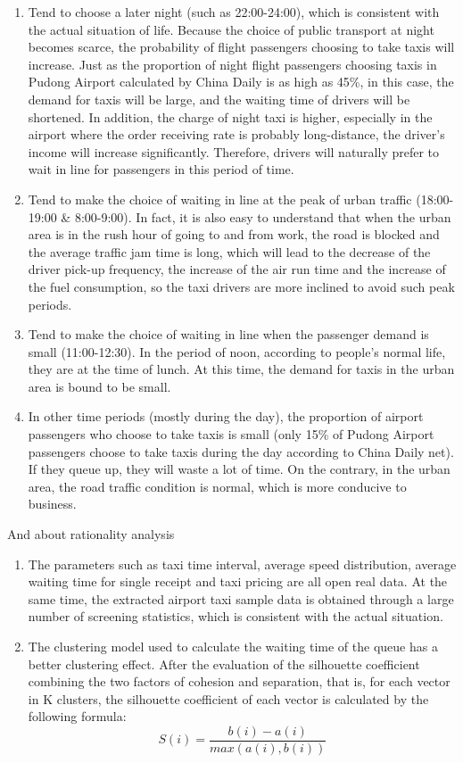 \begin{enumerate}
\item Tend to choose a later night (such as 22:00-24:00), which is consistent with the actual situation of life. Because the choice of public transport at night becomes scarce, the probability of flight passengers choosing to take taxis will increase. Just as the proportion of night flight passengers choosing taxis in Pudong Airport calculated by China Daily is as high as 45\%, in this case, the demand for taxis will be large, and the waiting time of drivers will be shortened. In addition, the charge of night taxi is higher, especially in the airport where the order receiving rate is probably long-distance, the driver's income will increase significantly. Therefore, drivers will naturally prefer to wait in line for passengers in this period of time.
\item Tend to make the choice of waiting in line at the peak of urban traffic (18:00-19:00 \& 8:00-9:00). In fact, it is also easy to understand that when the urban area is in the rush hour of going to and from work, the road is blocked and the average traffic jam time is long, which will lead to the decrease of the driver pick-up frequency, the increase of the air run time and the increase of the fuel consumption, so the taxi drivers are more inclined to avoid such peak periods.
\item Tend to make the choice of waiting in line when the passenger demand is small (11:00-12:30). In the period of noon, according to people's normal life, they are at the time of lunch. At this time, the demand for taxis in the urban area is bound to be small.
\item  In other time periods (mostly during the day), the proportion of airport passengers who choose to take taxis is small (only 15\% of Pudong Airport passengers choose to take taxis during the day according to China Daily net). If they queue up, they will waste a lot of time. On the contrary, in the urban area, the road traffic condition is normal, which is more conducive to business.
\end{enumerate}
And about rationality analysis
\begin{enumerate}
\item The parameters such as taxi time interval, average speed distribution, average waiting time for single receipt and taxi pricing are all open real data. At the same time, the extracted airport taxi sample data is obtained through a large number of screening statistics, which is consistent with the actual situation.
\item The clustering model used to calculate the waiting time of the queue has a better clustering effect. After the evaluation of the silhouette coefficient combining the two factors of cohesion and separation, that is, for each vector in K clusters, the silhouette coefficient\cite{kaufman2009finding} of each vector is calculated by the following formula:
\begin{equation} S(i) = \frac{b(i)-a(i)}{max(a(i),b(i))}\end{equation}
\end{enumerate}

